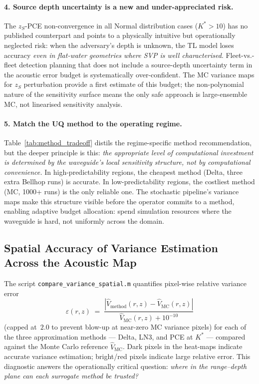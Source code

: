 \documentclass[11pt,a4paper]{article}
\begin{document}
\paragraph{4. Source depth uncertainty is a new and under-appreciated risk.}
The $z_S$-PCE non-convergence in all Normal distribution cases ($K^* > 10$) has no
published counterpart and points to a physically intuitive but operationally neglected risk:
when the adversary's depth is unknown, the TL model loses accuracy
\emph{even in flat-water geometries where SVP is well characterised}.
Fleet-vs.-fleet detection planning that does not include a source-depth uncertainty term
in the acoustic error budget is systematically over-confident.
The MC variance maps for $z_S$ perturbation provide a first estimate of this budget; the
non-polynomial nature of the sensitivity surface means the only safe approach is
large-ensemble MC, not linearised sensitivity analysis.

\paragraph{5. Match the UQ method to the operating regime.}
Table~\ref{tab:method_tradeoff} distils the regime-specific method recommendation,
but the deeper principle is this:
\emph{the appropriate level of computational investment is determined by the waveguide's
local sensitivity structure, not by computational convenience.}
In high-predictability regions, the cheapest method (Delta, three extra Bellhop runs) is
accurate.
In low-predictability regions, the costliest method (MC, 1000+ runs) is the only reliable
one.
The stochastic pipeline's variance maps make this structure visible before the operator
commits to a method, enabling adaptive budget allocation:
spend simulation resources where the waveguide is hard, not uniformly across the domain.

\subsection{Spatial Accuracy of Variance Estimation Across the Acoustic Map}
\label{sec:var_accuracy}

The script \texttt{compare\_variance\_spatial.m} quantifies pixel-wise relative variance error
\begin{equation}
  \varepsilon(r,z) \;=\; \frac{|\hat V_\text{method}(r,z) - \hat V_\text{MC}(r,z)|}%
                               {\hat V_\text{MC}(r,z) + 10^{-10}}
  \label{eq:rel_var_err}
\end{equation}
(capped at~$2.0$ to prevent blow-up at near-zero MC variance pixels) for each of the three
approximation methods --- Delta, LN3, and PCE at $K^*$ --- compared against the Monte Carlo
reference $\hat V_\text{MC}$.
Dark pixels in the heat-maps indicate accurate variance estimation; bright/red pixels indicate
large relative error.
This diagnostic answers the operationally critical question: \emph{where in the range--depth
plane can each surrogate method be trusted?}
\end{document}
